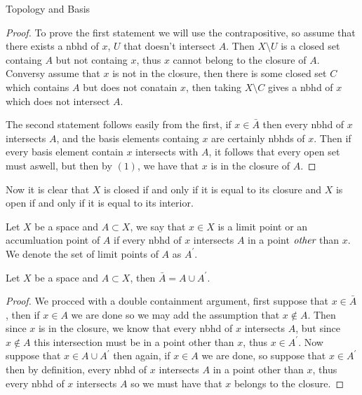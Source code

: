 \begin{chapter}{Topology and Basis}
   \begin{proof}
    To prove the first statement we will use the contrapositive, so assume that there exists a nbhd of $x$, $U$ that doesn't intersect $A$. Then 
    $X \setminus U$ is a closed set containg $A$ but not containg $x$, thus $x$ cannot belong to the closure of $A$. Conversy assume that $x$ is not in 
    the closure, then there is some closed set $C$ which contains $A$ but does not conatain $x$, then taking $X \setminus C$ gives a nbhd of $x$ which does not intersect 
    $A$. 

    The second statement follows easily from the first, if $x \in \bar{A}$ then every nbhd of $x$ intersects $A$, and the basis elements containg $x$ are certainly nbhds of $x$. 
    Then if every basis element contain $x$ intersects with $A$, it follows that every open set must aswell, but then by $(1)$, we have that $x$ is in the closure of $A$.
   \end{proof}


   Now it is clear that $X$ is closed if and only if it is equal to its closure and $X$ is open if and only if it is equal to its interior. 


   \begin{defn}
    Let $X$ be a space and $A \subset X$, we say that $x \in X$ is a limit point or an accumluation point of $A$ if every nbhd of $x$ intersects 
    $A$ in a point $\emph{other}$ than $x$. We denote the set of limit points of $A$ as $A^\prime$. 
   \end{defn}

   \begin{thm}
    Let $X$ be a space and $A \subset X$, then $\bar{A} = A \cup A^\prime$. 
   \end{thm}

   \begin{proof}
    We procced with a double containment argument, first suppose that $x \in \bar{A}$, then if $x \in A$ we are done so we may add the assumption that $x \notin A$. Then 
    since $x$ is in the closure, we know that every nbhd of $x$ intersects $A$, but since $x \notin A$ this intersection must be in a point other than $x$, thus $x \in A^\prime$. 
    Now suppose that $x \in A \cup A^\prime$ then again, if $x \in A$ we are done, so suppose that $x \in A^\prime$ then by definition, every nbhd of $x$ intersects $A$ in a point other than $x$, 
    thus every nbhd of $x$ intersects $A$ so we must have that $x$ belongs to the closure. 
   \end{proof}


\end{chapter}
